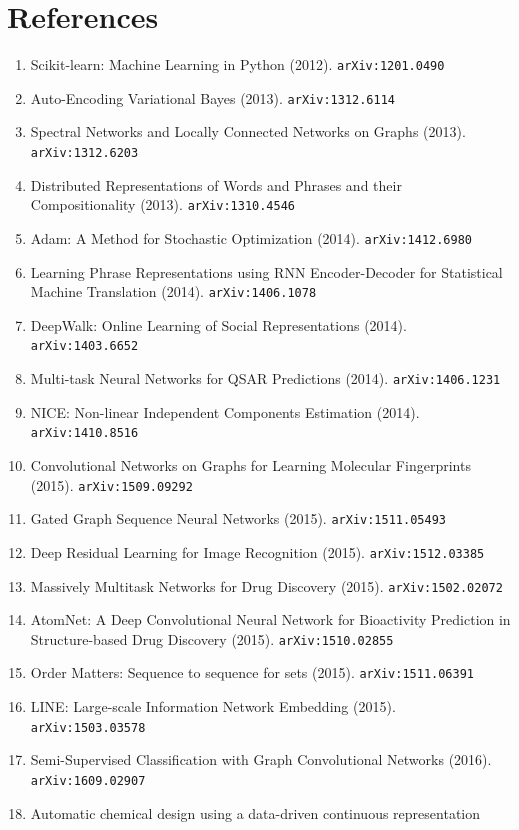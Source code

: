 \documentclass[11pt]{article}
\begin{document}
\section*{References}
\begin{enumerate}\small
  \item Scikit-learn: Machine Learning in Python (2012). \texttt{arXiv:1201.0490}
  \item Auto-Encoding Variational Bayes (2013). \texttt{arXiv:1312.6114}
  \item Spectral Networks and Locally Connected Networks on Graphs (2013). \texttt{arXiv:1312.6203}
  \item Distributed Representations of Words and Phrases and their
  Compositionality (2013). \texttt{arXiv:1310.4546}
  \item Adam: A Method for Stochastic Optimization (2014). \texttt{arXiv:1412.6980}
  \item Learning Phrase Representations using RNN Encoder-Decoder for
  Statistical Machine Translation (2014). \texttt{arXiv:1406.1078}
  \item DeepWalk: Online Learning of Social Representations (2014). \texttt{arXiv:1403.6652}
  \item Multi-task Neural Networks for QSAR Predictions (2014). \texttt{arXiv:1406.1231}
  \item NICE: Non-linear Independent Components Estimation (2014). \texttt{arXiv:1410.8516}
  \item Convolutional Networks on Graphs for Learning Molecular Fingerprints (2015). \texttt{arXiv:1509.09292}
  \item Gated Graph Sequence Neural Networks (2015). \texttt{arXiv:1511.05493}
  \item Deep Residual Learning for Image Recognition (2015). \texttt{arXiv:1512.03385}
  \item Massively Multitask Networks for Drug Discovery (2015). \texttt{arXiv:1502.02072}
  \item AtomNet: A Deep Convolutional Neural Network for Bioactivity Prediction
  in Structure-based Drug Discovery (2015). \texttt{arXiv:1510.02855}
  \item Order Matters: Sequence to sequence for sets (2015). \texttt{arXiv:1511.06391}
  \item LINE: Large-scale Information Network Embedding (2015). \texttt{arXiv:1503.03578}
  \item Semi-Supervised Classification with Graph Convolutional Networks (2016). \texttt{arXiv:1609.02907}
  \item Automatic chemical design using a data-driven continuous representation

\end{enumerate}
\end{document}

